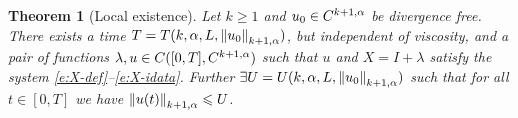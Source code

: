 \documentclass[final]{amsart}%
\newcommand{\snseqns}{\eqref{e:X-def}--\eqref{e:X-idata}}
\newcommand{\eleeqns}{\eqref{e:ele-Xdef}--\eqref{e:ele-Xidata}}
\newcommand{\leqs}{\leqslant}
\newcommand{\geqs}{\geqslant}
\newcommand{\Ifn}{I}
\newcommand{\holderspace}[2]{\ensuremath{C^{\ifx0#1{#2}\else{#1,#2}\fi}}}
\newif\iftextstyle
\newcommand{\hnorm}[3]{\iftextstyle\|#1\|\else\left\|#1\right\|\fi_{\ifx0#2{#3}\else{#2,#3}\fi}}
\numberwithin{equation}{section}
\newtheorem{theorem}{Theorem}[section]
\theoremstyle{definition}
\theoremstyle{remark}
\begin{document}
\begin{theorem}[Local existence]\label{t:snsexist}%
Let $k \geqs 1$ and $u_0 \in \holderspace{k+1}{\alpha}$ be divergence free. There exists a time $T = T(k, \alpha, L, \hnorm{u_0}{k+1}{\alpha})$, but independent of viscosity, and a pair of functions $\lambda, u \in C([0,T], \holderspace{k+1}{\alpha})$ such that $u$ and $X = \Ifn + \lambda$ satisfy the system \snseqns. Further $\exists U = U( k, \alpha, L, \hnorm{u_0}{k+1}{\alpha})$ such that for all $t \in [0,T]$ we have $\hnorm{u(t)}{k+1}{\alpha} \leqs U$.
\end{theorem}
% 
% 
% 
% 
\end{document}
